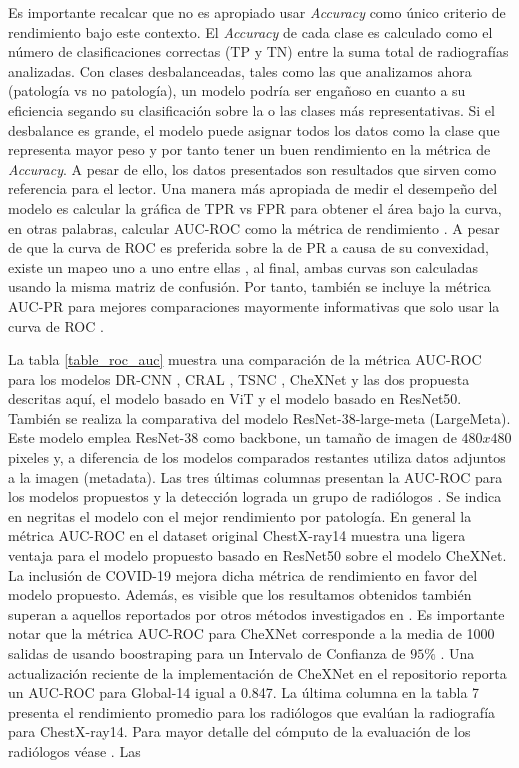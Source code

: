 {Es importante recalcar que no es apropiado usar \textit{Accuracy} como único criterio de rendimiento
bajo este contexto. El \textit{Accuracy} de cada clase es calculado como el número de clasificaciones
correctas (TP y TN) entre la suma total de radiografías analizadas. Con clases desbalanceadas,
tales como las que analizamos ahora (patología vs no patología), un modelo podría ser engañoso en cuanto
a su eficiencia segando su clasificación sobre la o las clases más representativas. Si el desbalance
es grande, el modelo puede asignar todos los datos como la clase que representa mayor peso y por tanto
tener un buen rendimiento en la métrica de \textit{Accuracy}. A pesar de ello, los datos presentados
son resultados que sirven como referencia para el lector. Una manera más apropiada de medir el desempeño
del modelo es calcular la gráfica de TPR vs FPR para obtener el área bajo la curva, en otras palabras,
calcular AUC-ROC como la métrica de rendimiento \cite{Hanley1983-tu}. A pesar de que la curva de ROC
es preferida sobre la de PR a causa de su convexidad, existe un mapeo uno a uno entre ellas
\cite{10.1145/1143844.1143874}, al final, ambas curvas son calculadas usando la misma matriz de
confusión. Por tanto, también se
incluye la métrica AUC-PR para mejores comparaciones mayormente informativas que solo usar la
curva de ROC \cite{Saito2015-db}.

La tabla \ref{table_roc_auc} muestra una comparación de la métrica AUC-ROC para los modelos DR-CNN
\cite{DBLP:journals/corr/abs-1808-05744}, CRAL \cite{GUAN2020259}, TSNC \cite{CHEN2020221}, CheXNet
\cite{rajpurkar2018deep} y las dos propuesta descritas aquí, el modelo basado en ViT y el modelo basado
en ResNet50. También se realiza la comparativa del modelo
ResNet-38-large-meta (LargeMeta). Este modelo emplea ResNet-38 como backbone, un tamaño de imagen de
$480 x 480$ pixeles y, a diferencia de los modelos comparados restantes utiliza datos adjuntos a la
imagen (metadata). Las tres últimas columnas presentan la AUC-ROC para los modelos propuestos y la
detección lograda un grupo de radiólogos \cite{rajpurkar2018deep}. Se indica en negritas el modelo
con el mejor rendimiento por patología.
En general la métrica AUC-ROC en el dataset original ChestX-ray14 muestra
una ligera ventaja para el modelo propuesto basado en ResNet50 sobre el modelo CheXNet. La inclusión
de COVID-19 mejora dicha métrica de rendimiento en favor del modelo propuesto. Además, es visible que
los resultamos obtenidos también superan a aquellos reportados por otros métodos investigados en
\cite{baltruschat2019comparison}. Es importante notar que la métrica AUC-ROC para CheXNet corresponde
a la media de 1000 salidas de usando boostraping para un Intervalo de Confianza de $95\%$
\cite{rajpurkar2018deep}. Una actualización reciente de la implementación de CheXNet en el repositorio
\cite{chexnet_code} reporta un AUC-ROC para Global-14 igual a 0.847. La última columna en la tabla 7 presenta
el rendimiento promedio para los radiólogos que evalúan la radiografía para ChestX-ray14. Para
mayor detalle del cómputo de la evaluación de los radiólogos véase \cite{rajpurkar2018deep}. Las }
